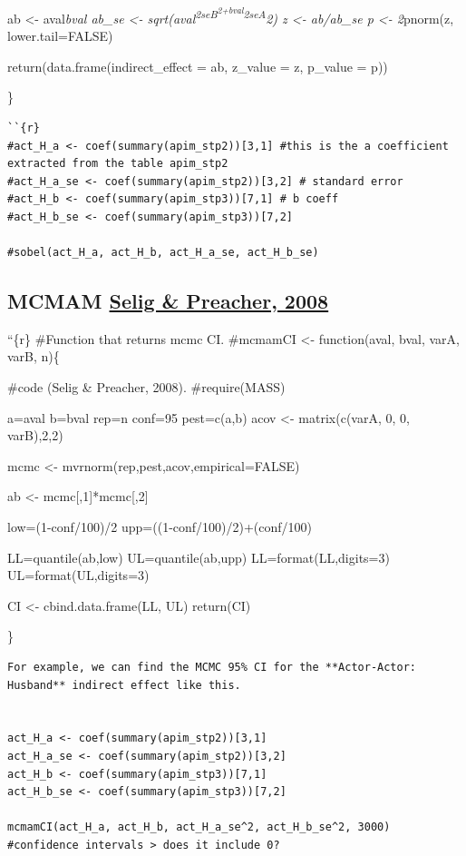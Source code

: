 \documentclass[
  man,floatsintext]{apa6}
\begin{document}
ab \textless- aval\emph{bval
ab\_se \textless- sqrt(aval\textsuperscript{2\emph{seB\textsuperscript{2+bval}2}seA}2)
z \textless- ab/ab\_se
p \textless- 2}pnorm(z, lower.tail=FALSE)

return(data.frame(indirect\_effect = ab, z\_value = z, p\_value = p))

\}

\begin{verbatim}
``{r}
#act_H_a <- coef(summary(apim_stp2))[3,1] #this is the a coefficient extracted from the table apim_stp2 
#act_H_a_se <- coef(summary(apim_stp2))[3,2] # standard error 
#act_H_b <- coef(summary(apim_stp3))[7,1] # b coeff
#act_H_b_se <- coef(summary(apim_stp3))[7,2]

#sobel(act_H_a, act_H_b, act_H_a_se, act_H_b_se)
\end{verbatim}

\hypertarget{mcmam-selig-preacher-2008}{%
\subsection{\texorpdfstring{MCMAM \href{http://www.quantpsy.org/medmc/medmc.htm}{Selig \& Preacher, 2008}}{MCMAM Selig \& Preacher, 2008}}\label{mcmam-selig-preacher-2008}}

``\{r\}
\#Function that returns mcmc CI.
\#mcmamCI \textless- function(aval, bval, varA, varB, n)\{

\#code (Selig \& Preacher, 2008).
\#require(MASS)

a=aval
b=bval
rep=n
conf=95
pest=c(a,b)
acov \textless- matrix(c(varA, 0, 0, varB),2,2)

mcmc \textless- mvrnorm(rep,pest,acov,empirical=FALSE)

ab \textless- mcmc{[},1{]}*mcmc{[},2{]}

low=(1-conf/100)/2
upp=((1-conf/100)/2)+(conf/100)

LL=quantile(ab,low)
UL=quantile(ab,upp)
LL=format(LL,digits=3)
UL=format(UL,digits=3)

CI \textless- cbind.data.frame(LL, UL)
return(CI)

\}

\begin{verbatim}
For example, we can find the MCMC 95% CI for the **Actor-Actor: Husband** indirect effect like this.


act_H_a <- coef(summary(apim_stp2))[3,1]
act_H_a_se <- coef(summary(apim_stp2))[3,2]
act_H_b <- coef(summary(apim_stp3))[7,1]
act_H_b_se <- coef(summary(apim_stp3))[7,2]

mcmamCI(act_H_a, act_H_b, act_H_a_se^2, act_H_b_se^2, 3000)
#confidence intervals > does it include 0?
\end{verbatim}
\end{document}
